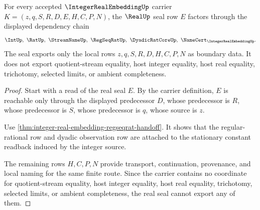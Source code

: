 \begin{theorem}
\label{thm:integer-real-embedding-realup-seal-nonescape}
For every accepted $\IntegerRealEmbeddingUp$ carrier $K=(z,q,S,R,D,E,H,C,P,N)$, the $\RealUp$ seal row $E$ factors through the displayed dependency chain
$$
\IntUp,\ \RatUp,\ \StreamNameUp,\ \RegSeqRatUp,\ \DyadicRatCoreUp,\ \NameCert_{\IntegerRealEmbeddingUp}.
$$
The seal exports only the local rows $z,q,S,R,D,H,C,P,N$ as boundary data. It does not export quotient-stream equality, host integer equality, host real equality, trichotomy, selected limits, or ambient completeness.
\end{theorem}
\begin{proof}
Start with a read of the real seal $E$. By the carrier definition, $E$ is reachable only through the displayed predecessor $D$, whose predecessor is $R$, whose predecessor is $S$, whose predecessor is $q$, whose source is $z$.

Use \autoref{thm:integer-real-embedding-regseqrat-handoff}. It shows that the regular-rational row and dyadic observation row are attached to the stationary constant readback induced by the integer source.

The remaining rows $H,C,P,N$ provide transport, continuation, provenance, and local naming for the same finite route. Since the carrier contains no coordinate for quotient-stream equality, host integer equality, host real equality, trichotomy, selected limits, or ambient completeness, the real seal cannot export any of them.
\end{proof}

\begin{closurestatus}{\IntegerRealEmbeddingUp}
  \theoryclosure{\seedClosure}
  \formalstatus{\unformalizedV}
\end{closurestatus}
